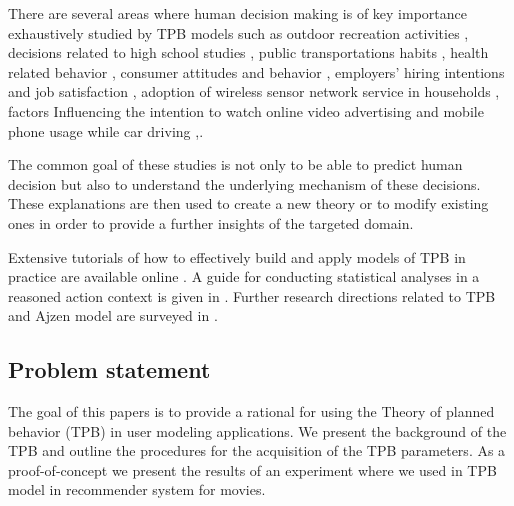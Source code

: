 \documentclass{llncs}
\begin{document}
There are several areas where human decision making is of key importance exhaustively studied by TPB models such as outdoor recreation activities \cite{Daigle2002}, decisions related to high school studies  \cite{Davis2002}, public transportations habits \cite{Bamberg2003}, health related behavior \cite{Ajzen2007},  consumer attitudes and behavior \cite{Ajzen2008},  employers' hiring intentions \cite{Fraser2010} and job satisfaction \cite{IcekAjzen2011}, adoption of wireless sensor network service in households \cite{Lin2011}, factors Influencing the intention to watch online video advertising \cite{Lee2011} and mobile phone usage while car driving \cite{Walsh2008},\cite{Zhou2012}. 

The common goal of these studies is not only to be able to predict human decision but also to understand the underlying mechanism of these decisions. These explanations are then used to create a new theory or to modify existing ones in order to provide a further insights of the targeted domain. 

Extensive tutorials of how to effectively build and apply models of TPB in practice are available online \cite{AjzenWebPage}.  A guide for conducting statistical analyses in a reasoned action context is given in \cite{Bleakley2012}. Further research directions related to TPB and Ajzen model are surveyed in \cite{Jaccard2012}.




\subsection{Problem statement}\label{SubSec_}

The goal of this papers is to provide a rational for using the Theory of planned behavior (TPB) in user modeling applications. We present the background of the TPB and outline the procedures for the acquisition of the TPB parameters. As a proof-of-concept we present the results of an experiment where we used in TPB model in recommender system for movies. 


\end{document}
